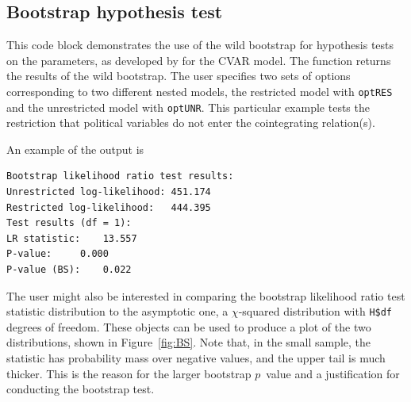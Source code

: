 \documentclass[article]{jss}
\newcommand{\fct}[1]{\code{#1()}}
\begin{document}

\subsection{Bootstrap hypothesis test}
\label{sec:bootstr-hypoth-test}

This code block
demonstrates the use of the wild bootstrap for hypothesis tests on the parameters, as developed by \cite{Boswijk2013} for the CVAR model. 
The function \fct{FCVARboot} returns the results of the wild bootstrap. 
The user specifies two sets of options corresponding to two different nested models, the restricted model with \verb|optRES| and the unrestricted model with \verb|optUNR|. 
This particular example tests the restriction that political variables do not enter the cointegrating relation(s).



An example of the output is
\begin{verbatim}
Bootstrap likelihood ratio test results:
Unrestricted log-likelihood: 451.174
Restricted log-likelihood:   444.395
Test results (df = 1):
LR statistic: 	 13.557
P-value: 	 0.000
P-value (BS): 	 0.022
\end{verbatim}

The user might also be interested in comparing the bootstrap likelihood ratio test statistic distribution to the asymptotic one, a $\chi$-squared distribution with \verb|H$df| degrees of freedom. 
These objects can be used to produce 
a plot of the two distributions, shown in Figure~\ref{fig:BS}.
Note that, in the small sample, the statistic has probability mass over negative values, 
and the upper tail is much thicker. 
This is the reason for the larger bootstrap $p$~value
and a justification for conducting the bootstrap test. 
\end{document}
